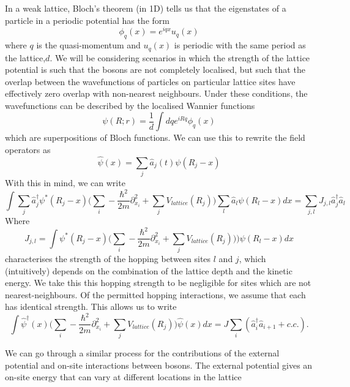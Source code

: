 \documentclass[a4paper,10pt]{article}
\begin{document}
In a weak lattice, Bloch's theorem (in 1D) tells us that the eigenstates of a particle in a periodic potential has the form
\begin{equation}
 \phi_q(x)=e^{iqx}u_{q}(x)
\end{equation}
where $q$ is the quasi-momentum and $u_q(x)$ is periodic with the same period as the lattice,$d$. We will be considering scenarios in which the strength of the lattice potential
is such that the bosons are not completely localised, but such that the overlap between the wavefunctions of particles on particular lattice sites have effectively zero overlap 
with non-nearest neighbours. Under these conditions, the wavefunctions can be described by the localised Wannier functions
\begin{equation}
\psi(R;r)=\frac{1}{d}\int dq e^{iRq}\phi_q(x)
\end{equation}
which are superpositions of Bloch functions. We can use this to rewrite the field operators as 
\begin{equation}
 \hat{\psi}(x)=\sum_j \hat{a}_{j}(t)\psi(R_j-x)
\end{equation}
With this in mind, we can write
\begin{equation}
 \int  \sum_j\hat{a}_j^{\dagger}\psi^{*}(R_j-x) \bigg(  \sum_{i}-\frac{\hbar^{2}}{2m}  \partial_{x_{i}}^2+\sum_{j}V_{lattice}(R_{j})  \bigg)  \sum_l  \hat{a}_l\psi(R_l-x)dx=\sum_{j,l} J_{j,l}\hat{a}_{j}^{\dagger}\hat{a}_l
\end{equation}
Where
\begin{equation}
 J_{j,l}=\int  \psi^{*}(R_j-x) \bigg(  \sum_{i}-\frac{\hbar^{2}}{2m}  \partial_{x_{i}}^2+\sum_{j}V_{lattice}(R_{j}))  \bigg)  \psi(R_l-x)dx
\end{equation}
characterises the strength of the hopping between sites $l$ and $j$, which (intuitively) depends on the combination of the lattice depth and the kinetic energy. We take this this hopping strength to be negligible
for sites which are not nearest-neighbours. Of the permitted hopping interactions, we assume that each has identical strength. This allows us to write
\begin{equation}
 \int  \hat{\psi}^{\dagger}(x) \bigg(  \sum_{i}-\frac{\hbar^{2}}{2m}  \partial_{x_{i}}^2+\sum_{j}V_{lattice}(R_{j})  \bigg)    \hat{\psi}(x)dx=J\sum_{i}(\hat{a}^\dagger_{i}\hat{a}_{i+1}+c.c.).
\end{equation}

We can go through a similar process for the contributions of the external potential and on-site interactions between bosons. The external potential gives an on-site energy that can vary
at different locations in the lattice
\end{document}
